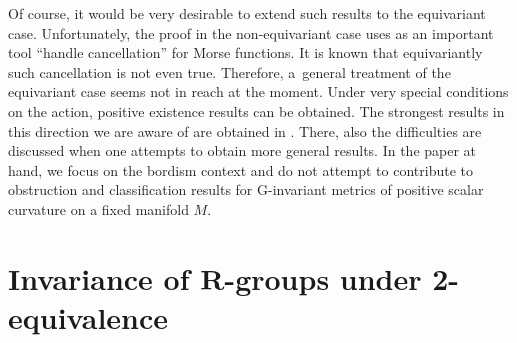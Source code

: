 \documentclass[pdftex]{sigma}
\numberwithin{equation}{section}
\begin{document}
	Of course, it would be very desirable to extend such results to the
	equivariant case. Unfortunately, the proof in the non-equivariant case uses as
	an important tool ``handle cancellation'' for Morse functions. It is known
	that equivariantly such cancellation is not even true. Therefore, a~general
	treatment of the equivariant case seems not in reach at the moment. Under very
	special conditions on the action, positive existence results can be
	obtained. The strongest results in this direction we are aware of are obtained
	in \cite{Hanke}. There, also the difficulties are discussed when one attempts
	to obtain more general results. In the paper at hand, we focus on the bordism
	context and do not attempt to contribute to obstruction and classification
	results for G-invariant metrics of positive scalar curvature on a fixed
	manifold $M$.
	
\section[Invariance of R-groups under 2-equivalence]{Invariance of $\boldsymbol{R}$-groups under 2-equivalence}
	
\end{document}
